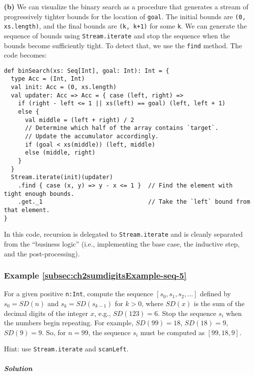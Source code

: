 \textbf{(b)} We can visualize the binary search as a procedure that
generates a stream of progressively tighter bounds for the location
of \lstinline!goal!. The initial bounds are \lstinline!(0, xs.length)!,
and the final bounds are \lstinline!(k, k+1)! for some \lstinline!k!.
We can generate the sequence of bounds using \lstinline!Stream.iterate!
and stop the sequence when the bounds become sufficiently tight. To
detect that, we use the \lstinline!find! method. The code becomes:
\begin{lstlisting}
def binSearch(xs: Seq[Int], goal: Int): Int = {
  type Acc = (Int, Int)
  val init: Acc = (0, xs.length)
  val updater: Acc => Acc = { case (left, right) =>
    if (right - left <= 1 || xs(left) == goal) (left, left + 1)
    else {
      val middle = (left + right) / 2
      // Determine which half of the array contains `target`.
      // Update the accumulator accordingly.
      if (goal < xs(middle)) (left, middle)
      else (middle, right)
    }
  }
  Stream.iterate(init)(updater)
    .find { case (x, y) => y - x <= 1 }  // Find the element with tight enough bounds.
    .get._1                              // Take the `left` bound from that element.
}
\end{lstlisting}
In this code, recursion is delegated to \lstinline!Stream.iterate!
and is cleanly separated from the \textsf{``}business logic\textsf{''} (i.e., implementing
the base case, the inductive step, and the post-processing).

\subsubsection{Example \label{subsec:ch2sumdigitsExample-seq-5}\ref{subsec:ch2sumdigitsExample-seq-5}}

For a given positive \lstinline!n:Int!, compute the sequence $\left[s_{0},s_{1},s_{2},...\right]$
defined by $s_{0}=SD(n)$ and $s_{k}=SD(s_{k-1})$ for $k>0$, where
$SD(x)$ is the sum of the decimal digits of the integer $x$, e.g.,
$SD(123)=6$. Stop the sequence $s_{i}$ when the numbers begin repeating.
For example, $SD(99)=18$, $SD(18)=9$, $SD(9)=9$. So, for $n=99$,
the sequence $s_{i}$ must be computed as $\left[99,18,9\right]$.

Hint: use \lstinline!Stream.iterate! and \lstinline!scanLeft!.

\subparagraph{Solution}

